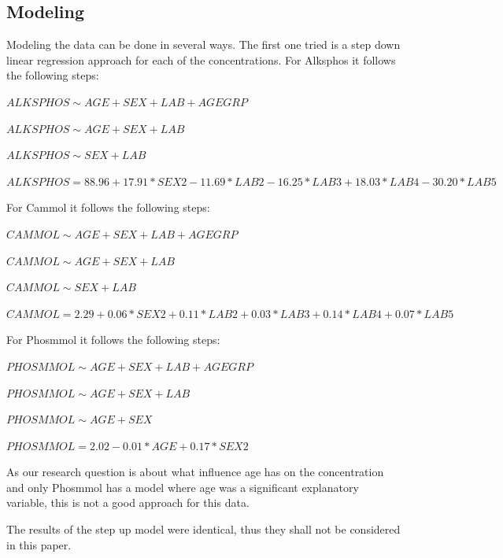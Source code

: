 \documentclass{article}
\begin{document}
    \subsection{Modeling}
      Modeling the data can be done in several ways.
      The first one tried is a step down linear regression approach for each of the concentrations.
      For Alksphos it follows the following steps:
      \begin{itemize}
        \scriptsize{\item $ALKSPHOS \sim AGE + SEX + LAB + AGEGRP$}
        \scriptsize{\item $ALKSPHOS \sim AGE + SEX + LAB$}
        \scriptsize{\item $ALKSPHOS \sim SEX + LAB$}
        \scriptsize{\item $ALKSPHOS = 88.96 + 17.91*SEX2 - 11.69*LAB2 - 16.25*LAB3 + 18.03*LAB4 - 30.20*LAB5$}
      \end{itemize}
      For Cammol it follows the following steps:
      \begin{itemize}
        \scriptsize{\item $CAMMOL \sim AGE + SEX + LAB + AGEGRP$}
        \scriptsize{\item $CAMMOL \sim AGE + SEX + LAB$}
        \scriptsize{\item $CAMMOL \sim SEX + LAB$}
        \scriptsize{\item $CAMMOL = 2.29 + 0.06*SEX2 + 0.11*LAB2 + 0.03*LAB3 + 0.14*LAB4 + 0.07*LAB5$}
      \end{itemize}
      For Phosmmol it follows the following steps:
      \begin{itemize}
        \scriptsize{\item $PHOSMMOL \sim AGE + SEX + LAB + AGEGRP$}
        \scriptsize{\item $PHOSMMOL \sim AGE + SEX + LAB$}
        \scriptsize{\item $PHOSMMOL \sim AGE + SEX$}
        \scriptsize{\item $PHOSMMOL = 2.02 - 0.01*AGE + 0.17*SEX2$}
      \end{itemize}
      As our research question is about what influence age has on the concentration and only Phosmmol has a model where age was a significant explanatory variable, this is not a good approach for this data.
      
      The results of the step up model were identical, thus they shall not be considered in this paper.
\end{document}
